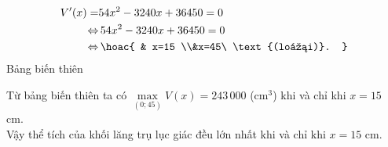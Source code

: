 \begin{ex}
{\begin{align*}
            V'(x)=          & 54x^2-3240x+36450 =0          \\
            \Leftrightarrow & \, 54x^2-3240x+36450=0        \\
            \Leftrightarrow & \, \hoac{              & x=15 \\&x=45\ \text{(loại)}. }
        \end{align*}
        Bảng biến thiên
        \begin{center}
        \end{center}
        Từ bảng biến thiên ta có $\max\limits_{(0;45)}V(x)=243\,000$ (cm$^3$) khi và chỉ khi $x=15$ cm.\\
        Vậy thể tích của khối lăng trụ lục giác đều lớn nhất khi và chỉ khi $x=15$ cm.
    }
\end{ex}

